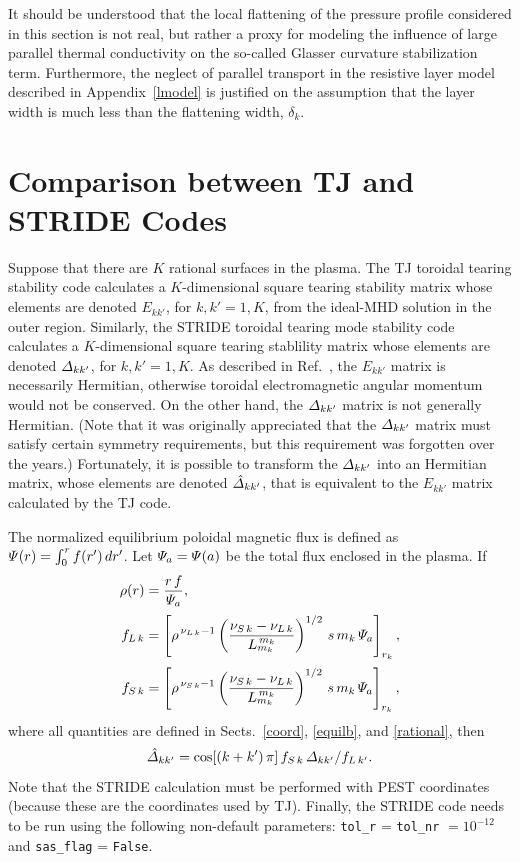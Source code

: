 \documentclass[12pt,prb,aps]{revtex4-1}
\begin{document}
It should be understood that the local flattening of the pressure profile considered in this section is not real, but rather a proxy for modeling the influence of large parallel thermal conductivity on the so-called 
Glasser curvature stabilization term.\cite{ggj,ggj1,con1} Furthermore,  the neglect of parallel transport in the resistive layer model
described in Appendix~\ref{lmodel} is justified on the assumption that the layer width is much less than the flattening width, $\delta_{k}$. 

\section{Comparison between TJ and STRIDE Codes}\label{comp}
Suppose that there are $K$ rational surfaces in the plasma. 
The TJ toroidal tearing stability code calculates a $K$-dimensional square tearing stability matrix whose elements are denoted $E_{kk'}$, for $k,k'=1,K$, from the
ideal-MHD solution in the outer region.\cite{tj} Similarly, the STRIDE toroidal tearing mode stability code calculates a $K$-dimensional square tearing stablility
matrix whose elements are denoted ${\mit\Delta}_{kk'}$, for $k,k'=1,K$.\cite{aglas1} As described in Ref.~, the $E_{kk'}$ matrix is necessarily Hermitian,
otherwise toroidal electromagnetic angular momentum would not be conserved. On the other hand, the ${\mit\Delta}_{kk'}$ matrix is not generally Hermitian. 
(Note that it was originally appreciated that the ${\mit\Delta}_{kk'}$ matrix must satisfy certain symmetry requirements,\cite{pletz1} but this requirement
was forgotten over the years.) Fortunately, it is possible to transform the ${\mit\Delta}_{kk'}$ into an Hermitian matrix, whose elements are denoted $\hat{\mit\Delta}_{kk'}$, 
that is equivalent to the $E_{kk'}$ matrix calculated by the TJ code. 

The normalized  equilibrium poloidal magnetic flux is defined as ${\mit\Psi}(r)= \int_0^r f(r')\,dr'$. Let ${\mit\Psi}_a={\mit\Psi}(a)$ be the total flux enclosed in the plasma. 
If
\begin{align}
\rho(r) &= \frac{r\,f}{{\mit\Psi}_a},\\[0.5ex]
f_{L\,k}& = \left[\rho^{\,\nu_{L\,k}-1}\left(\frac{\nu_{S\,k}-\nu_{L\,k}}{L_{m_k}^{\,m_k}}\right)^{1/2}\,s\,m_k\,{\mit\Psi}_a\right]_{r_k},\\[0.5ex]
f_{S\,k}& = \left[\rho^{\,\nu_{S\,k}-1}\left(\frac{\nu_{S\,k}-\nu_{L\,k}}{L_{m_k}^{\,m_k}}\right)^{1/2}\,s\,m_k\,{\mit\Psi}_a\right]_{r_k},
\end{align}
where all quantities are defined in Sects.~\ref{coord}, \ref{equilb}, and \ref{rational}, then
\begin{equation}
\hat{\mit\Delta}_{kk'} = \cos[(k+k')\,\pi]\,f_{S\,k}\,{\mit\Delta}_{kk'}/f_{L\,k'}.
\end{equation}
Note that the STRIDE calculation must be performed with PEST coordinates (because these are the coordinates used by TJ). Finally, the
STRIDE code needs to be run using the following non-default parameters: \verb|tol_r| = \verb|tol_nr| $=10^{-12}$ and \verb|sas_flag| = \verb|False|. 
\end{document}
